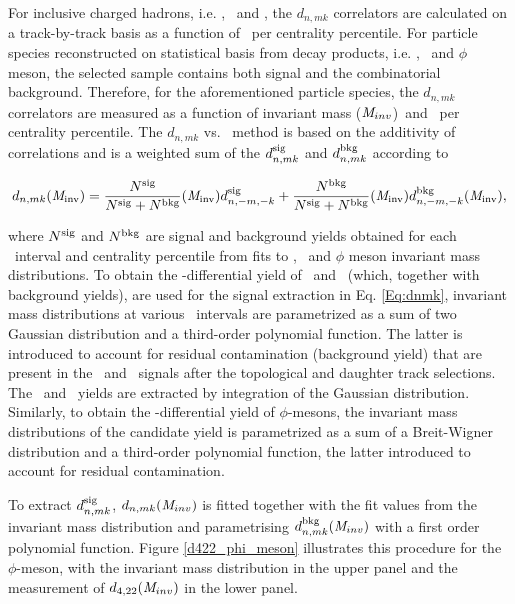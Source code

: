\documentclass[ALICE,manyauthors]{cernphprep}
\begin{document}
For inclusive charged hadrons, i.e. \pion, \kaon~and \proton, the $d_{n,mk}$ correlators are calculated on a track-by-track basis as a function of \pT~per centrality percentile. For particle species reconstructed on statistical basis from decay products, i.e. \Ks, \lambdas~and $\phi$ meson, the selected sample contains both signal and the combinatorial background. Therefore, for the aforementioned particle species, the $d_{n,mk}$ correlators are measured as a function of invariant mass (${\it M}_{inv}$)~and \pT~per centrality percentile. The $d_{n,mk}$ vs. \minv~method is based on the additivity of correlations and is a weighted sum of the $d_{n,mk}^{\rm{sig}}$ and $d_{n,mk}^{\rm{bkg}}$ according to

\begin{equation}
d_{n,mk}({\it M}_{\rm inv}) = \frac{N^{\rm sig}}{N^{\rm sig}+N^{\rm bkg}}({\it M}_{\rm inv})d_{n,-m,-k}^{\rm sig}+\frac{N^{\rm bkg}}{N^{{\rm sig}}+N^{{\rm bkg}}}({\it M}_{\rm inv})d_{n,-m,-k}^{\rm bkg}({\it M}_{\rm inv}),
\label{Eq:dnmk}
\end{equation}

where $N^{\rm{sig}}$ and $N^{\rm{bkg}}$ are signal and background yields obtained for each \pT~interval and centrality percentile from fits to \Ks, \lambdas~and $\phi$ meson invariant mass distributions.%
To obtain the \pT-differential yield of \Ks~and \lambdas~(which, together with background yields), are used for the signal extraction in Eq. \ref{Eq:dnmk}, invariant mass distributions at various \pT~intervals are parametrized as a sum of two Gaussian distribution and a third-order polynomial function. The latter is introduced to account for residual contamination (background yield) that are present in the \Ks~and \lambdas~signals after the topological and daughter track selections. The \Ks~and \lambdas~yields are extracted by integration of the Gaussian distribution. %
Similarly, to obtain the \pT-differential yield of $\phi$-mesons, the invariant mass distributions of the candidate yield is parametrized as a sum of a Breit-Wigner distribution and a third-order polynomial function, the latter introduced to account for residual contamination.

To extract $d_{n,mk}^{\rm{sig}}$, $d_{n,mk}({\it M}_{inv})$ is fitted together with the fit values from the invariant mass distribution and parametrising $d_{n,mk}^{\rm{bkg}}({\it M}_{inv})$ with a first order polynomial function. Figure \ref{d422_phi_meson} illustrates this procedure for the $\phi$-meson, with the invariant mass distribution in the upper panel and the measurement of $d_{4,22}({\it M}_{inv})$ in the lower panel. 
\end{document}

